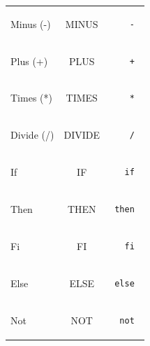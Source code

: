 \documentclass[pdftex,10pt,a4paper]{article}
\begin{document}
\begin{tabular}{|l|c|r|}
  Minus (-) & MINUS & \begin{minipage}{2in} \begin{verbatim} - \end{verbatim} \end{minipage} \\
  Plus (+) & PLUS & \begin{minipage}{2in} \begin{verbatim} + \end{verbatim} \end{minipage} \\
  Times (*) & TIMES & \begin{minipage}{2in} \begin{verbatim} * \end{verbatim} \end{minipage} \\
  Divide (/) & DIVIDE & \begin{minipage}{2in} \begin{verbatim} / \end{verbatim} \end{minipage} \\


  If & IF & \begin{minipage}{2in} \begin{verbatim} if \end{verbatim} \end{minipage} \\
  Then & THEN & \begin{minipage}{2in} \begin{verbatim} then \end{verbatim} \end{minipage} \\
  Fi & FI & \begin{minipage}{2in} \begin{verbatim} fi \end{verbatim} \end{minipage} \\
  Else & ELSE & \begin{minipage}{2in} \begin{verbatim} else \end{verbatim} \end{minipage} \\
  Not & NOT & \begin{minipage}{2in} \begin{verbatim} not \end{verbatim} \end{minipage} \\


\end{tabular}
\end{document}
